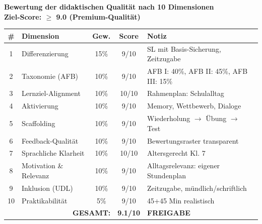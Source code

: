 \documentclass[11pt,a4paper]{article}
\begin{document}
\begin{scorebox}
\textbf{Bewertung der didaktischen Qualität nach 10 Dimensionen}\\
\textbf{Ziel-Score: $\geq$ 9.0 (Premium-Qualität)}

\vspace{1em}
\begin{tabular}{|c|l|c|c|p{4.5cm}|}
\hline
\textbf{\#} & \textbf{Dimension} & \textbf{Gew.} & \textbf{Score} & \textbf{Notiz} \\
\hline
1 & Differenzierung & 15\% & 9/10 & SL mit Basis-Sicherung, Zeitzugabe \\
\hline
2 & Taxonomie (AFB) & 10\% & 9/10 & AFB I: 40\%, AFB II: 45\%, AFB III: 15\% \\
\hline
3 & Lernziel-Alignment & 10\% & 10/10 & Rahmenplan: Schulalltag \\
\hline
4 & Aktivierung & 10\% & 9/10 & Memory, Wettbewerb, Dialoge \\
\hline
5 & Scaffolding & 10\% & 9/10 & Wiederholung $\rightarrow$ Übung $\rightarrow$ Test \\
\hline
6 & Feedback-Qualität & 10\% & 9/10 & Bewertungsraster transparent \\
\hline
7 & Sprachliche Klarheit & 10\% & 10/10 & Altersgerecht Kl. 7 \\
\hline
8 & Motivation \& Relevanz & 10\% & 9/10 & Alltagsrelevanz: eigener Stundenplan \\
\hline
9 & Inklusion (UDL) & 10\% & 9/10 & Zeitzugabe, mündlich/schriftlich \\
\hline
10 & Praktikabilität & 5\% & 9/10 & 45+45 Min realistisch \\
\hline
\multicolumn{3}{|r|}{\textbf{GESAMT:}} & \textbf{9.1/10} & \textcolor{successgreen}{\textbf{FREIGABE}} \\
\hline
\end{tabular}
\end{scorebox}
\end{document}
